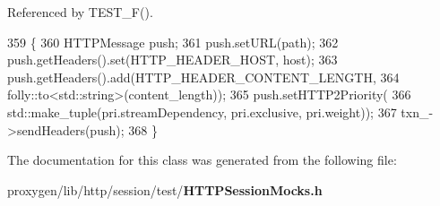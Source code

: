 Referenced by T\+E\+S\+T\+\_\+\+F().


\begin{DoxyCode}
359                                                 \{
360     HTTPMessage push;
361     push.setURL(path);
362     push.getHeaders().set(HTTP\_HEADER\_HOST, host);
363     push.getHeaders().add(HTTP\_HEADER\_CONTENT\_LENGTH,
364                           folly::to<std::string>(content\_length));
365     push.setHTTP2Priority(
366         std::make\_tuple(pri.streamDependency, pri.exclusive, pri.weight));
367     txn_->sendHeaders(push);
368   \}
\end{DoxyCode}


The documentation for this class was generated from the following file\+:\begin{DoxyCompactItemize}
\item 
proxygen/lib/http/session/test/{\bf H\+T\+T\+P\+Session\+Mocks.\+h}\end{DoxyCompactItemize}
